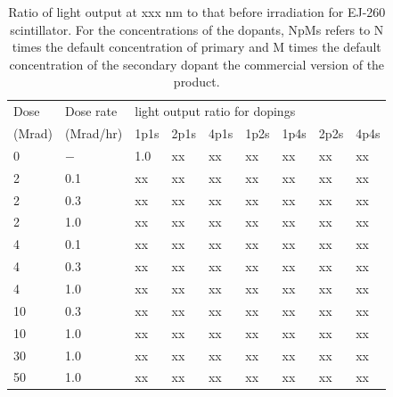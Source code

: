 \documentclass[review]{elsarticle}
\begin{document}
\begin{table}[thb]
\centering
\caption{
Ratio of light output at {\color{red} xxx nm} to that before irradiation
for EJ-260 scintillator.  For the concentrations
of the dopants, NpMs refers to N times the default concentration of primary and M times the default concentration of the secondary dopant
the commercial version of the product.
}
\label{tab:ResultsEJ260}
{\small
\begin{tabular}{|l| l| l| l| l| l| l| l| l|}
\hline
Dose & Dose rate  &\multicolumn{7}{|l|}{light output ratio for dopings} \\
(Mrad)  & (Mrad/hr) & 1p1s & 2p1s & 4p1s & 1p2s & 1p4s & 2p2s & 4p4s   \\
\hline
\hline
0 & $-$ & 1.0 & {\color{red} xx} & {\color{red} xx} & {\color{red} xx}& {\color{red} xx} & {\color{red} xx} & {\color{red} xx}\\ \hline
2 & 0.1 & {\color{red} xx} & {\color{red} xx} & {\color{red} xx} & {\color{red} xx}& {\color{red} xx} & {\color{red} xx} & {\color{red} xx}\\
2 & 0.3 & {\color{red} xx} & {\color{red} xx} & {\color{red} xx} & {\color{red} xx}& {\color{red} xx} & {\color{red} xx} & {\color{red} xx}\\
2 & 1.0 & {\color{red} xx} & {\color{red} xx} & {\color{red} xx} & {\color{red} xx}& {\color{red} xx} & {\color{red} xx} & {\color{red} xx}\\ \hline
4 & 0.1 & {\color{red} xx} & {\color{red} xx} & {\color{red} xx} & {\color{red} xx}& {\color{red} xx} & {\color{red} xx} & {\color{red} xx}\\
4 & 0.3 & {\color{red} xx} & {\color{red} xx} & {\color{red} xx} & {\color{red} xx} & {\color{red} xx} & {\color{red} xx} & {\color{red} xx}\\ 
4 & 1.0 & {\color{red} xx} & {\color{red} xx} & {\color{red} xx} & {\color{red} xx}& {\color{red} xx} & {\color{red} xx} & {\color{red} xx}\\ \hline
10 & 0.3 & {\color{red} xx} & {\color{red} xx} & {\color{red} xx} & {\color{red} xx}& {\color{red} xx} & {\color{red} xx} & {\color{red} xx}\\
10 & 1.0 & {\color{red} xx} & {\color{red} xx} & {\color{red} xx} & {\color{red} xx}& {\color{red} xx} & {\color{red} xx} & {\color{red} xx}\\ \hline
30 & 1.0 & {\color{red} xx} & {\color{red} xx} & {\color{red} xx} & {\color{red} xx}& {\color{red} xx} & {\color{red} xx} & {\color{red} xx}\\ \hline
50 & 1.0 & {\color{red} xx} & {\color{red} xx} & {\color{red} xx} & {\color{red} xx}& {\color{red} xx} & {\color{red} xx} & {\color{red} xx}\\ \hline
\hline
\end{tabular}
}
\end{table}
\end{document}
